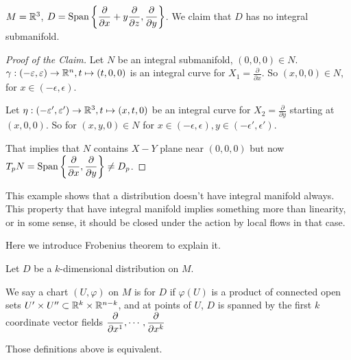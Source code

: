 \begin{example}
     $ M=\mathbb R^3 $,  $ D=\mathrm{Span}\left\{\displaystyle\frac{\partial}{\partial x}+y\frac{\partial }{\partial z},\frac{\partial }{\partial y}\right\} $. We claim that  $ D  $ has no integral submanifold.  
    
\end{example}
\begin{proof}[Proof of the Claim]
    Let  $ N  $ be an integral submanifold,  $ (0,0,0)\in N $.  $ \gamma:
    (-\varepsilon,\varepsilon)\rightarrow \mathbb R^n,t\mapsto (t,0,0) $ is an  integral curve for  $ X_1=\frac{\partial}{\partial x}$. So  $ (x,0,0)\in N $, for  $ x\in (-\epsilon,\epsilon) $.
    
    Let  $ \eta:(-\varepsilon',\varepsilon')\rightarrow \mathbb R^3,t\mapsto (x,t,0) $ be an integral curve for  $ X_2=\frac{\partial}{\partial y} $ starting at  $ (x,0,0) $. So for  $ (x,y,0) \in N$ for  $ x\in(-\epsilon,\epsilon),y\in(-\epsilon',\epsilon') $.
    
    That implies that  $ N  $ contains  $ X-Y $ plane near  $ (0,0,0) $ but now  $ T_pN=\mathrm{Span}\displaystyle\left\{\frac{\partial }{\partial x},\frac{\partial}{\partial y}\right\}\neq D_p $.   
\end{proof}
\begin{remark}
    This example shows that a distribution doesn't have integral manifold always. This property that have integral manifold implies something more than linearity, or in some sense, it should be closed under the action by local flows in that case.

    Here we introduce Frobenius theorem to explain it.
\end{remark}
\begin{definition}
    Let  $ D  $ be a  $ k $-dimensional distribution on  $ M $.
    
    We say a chart  $ (U,\varphi) $ on  $ M  $ is  for  $ D $ if  $ \varphi(U) $ is a product of connected open sets  $ U'\times U''\subset \mathbb R^k\times \mathbb R^{n-k} $, and at points of  $ U $,  $ D  $ is spanned by the first  $ k $ coordinate vector fields  $\displaystyle \frac{\partial}{\partial x^1},\cdots,\frac{\partial}{\partial x^k} $   
\end{definition}
\begin{theorem}\label{thm:local-frobenius}
    Those definitions above is equivalent.
\end{theorem}
